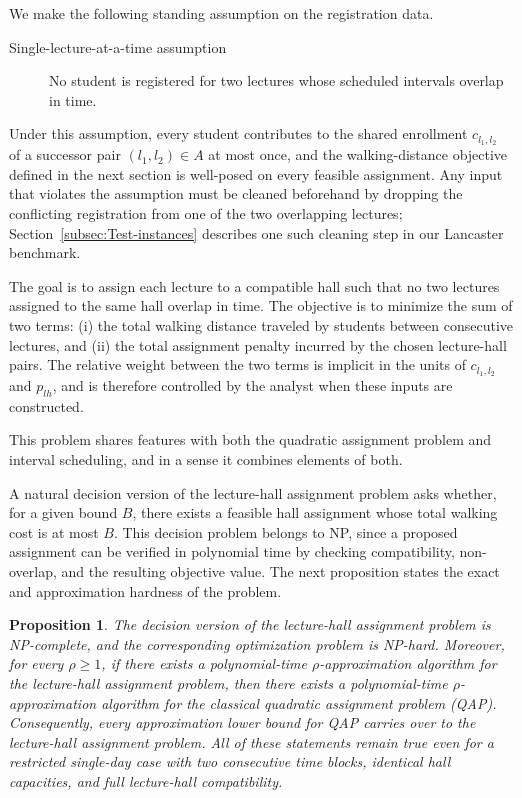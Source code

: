 \documentclass[11pt]{article}
\newtheorem{proposition}[theorem]{Proposition}
\begin{document}
We make the following standing assumption on the registration data.
\begin{description}
    \item[Single-lecture-at-a-time assumption]\label{asm:single-lecture} No student is registered for two lectures whose scheduled intervals overlap in time.
\end{description}
Under this assumption, every student contributes to the shared enrollment $c_{l_1,l_2}$ of a successor pair $(l_1,l_2)\in A$ at most once, and the walking-distance objective defined in the next section is well-posed on every feasible assignment. Any input that violates the assumption must be cleaned beforehand by dropping the conflicting registration from one of the two overlapping lectures; Section~\ref{subsec:Test-instances} describes one such cleaning step in our Lancaster benchmark.

The goal is to assign each lecture to a compatible hall such that no two lectures assigned to the same hall overlap in time. The objective is to minimize the sum of two terms: (i) the total walking distance traveled by students between consecutive lectures, and (ii) the total assignment penalty incurred by the chosen lecture-hall pairs. The relative weight between the two terms is implicit in the units of $c_{l_1,l_2}$ and $p_{lh}$, and is therefore controlled by the analyst when these inputs are constructed.

This problem shares features with both the quadratic assignment problem and interval scheduling, and in a sense it combines elements of both.

A natural decision version of the lecture-hall assignment problem asks whether, for a given bound $B$, there exists a feasible hall assignment whose total walking cost is at most $B$. This decision problem belongs to NP, since a proposed assignment can be verified in polynomial time by checking compatibility, non-overlap, and the resulting objective value. The next proposition states the exact and approximation hardness of the problem.

\begin{proposition}
\label{prop:hardness}
The decision version of the lecture-hall assignment problem is NP-complete, and the corresponding optimization problem is NP-hard. Moreover, for every $\rho \ge 1$, if there exists a polynomial-time $\rho$-approximation algorithm for the lecture-hall assignment problem, then there exists a polynomial-time $\rho$-approximation algorithm for the classical quadratic assignment problem (QAP). Consequently, every approximation lower bound for QAP carries over to the lecture-hall assignment problem. All of these statements remain true even for a restricted single-day case with two consecutive time blocks, identical hall capacities, and full lecture-hall compatibility.
\end{proposition}
\end{document}
